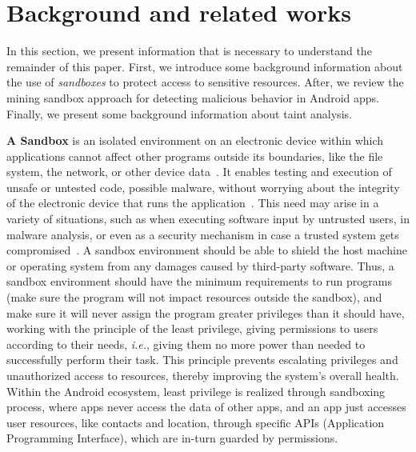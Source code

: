 \section{Background and related works}


In this section, we present information that is necessary to understand the remainder of this paper. First, we introduce some background information about the use of \emph{sandboxes} to protect access to sensitive resources. After, we review the mining sandbox approach for detecting malicious behavior in Android apps. Finally, we present some background information about taint analysis.

\textbf{A Sandbox} is an isolated environment on an electronic device within which applications cannot affect other programs outside its boundaries, like the file system, the network, or other device data~\cite{DBLP:journals/peerj-cs/MaassSCS16}. It enables testing and execution of unsafe or untested code, possible malware, without worrying about the integrity of the electronic device that runs the application~\cite{DBLP:conf/esorics/BordoniCS17}. This need may arise in a variety of situations, such as when executing software input by untrusted users, in malware analysis, or even as a security mechanism in case a trusted system gets compromised~\cite{DBLP:journals/peerj-cs/MaassSCS16}.
A sandbox environment should be able to shield the host machine or operating system from any damages caused by third-party software. Thus, a sandbox environment should have the minimum requirements to run programs (make sure the program will not impact resources outside the sandbox), and make sure it will never assign the program greater privileges than it should have, working with the principle of the least privilege, giving permissions to users according to their needs, \textit{i.e.}, giving them no more power than needed to successfully perform their task. This principle prevents escalating privileges and unauthorized access to resources, thereby improving the system's overall health. Within the Android ecosystem, least privilege is realized through sandboxing process, where apps never access the data of other apps, and an app just accesses user resources, like contacts and location, through specific APIs (Application Programming Interface), which are in-turn guarded by permissions.

